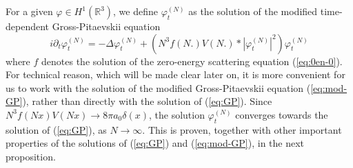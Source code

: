 \documentclass[11pt,a4paper,DIV11]{scrartcl}	%
\newcommand{\bR}{{\mathbb R}}
\begin{document}
For a given $\varphi \in H^1 (\bR^3)$, we define $\varphi^{(N)}_t$ as the solution of the modified time-dependent Gross-Pitaevskii equation
\begin{equation}\label{eq:mod-GP} i\partial_t \varphi_t^{(N)} = - \Delta \varphi_t^{(N)} + \left( N^3 f(N.) V(N.) * |\varphi^{(N)}_t|^2 \right) \varphi_t^{(N)} \end{equation}
where $f$ denotes the solution of the zero-energy scattering equation (\ref{eq:0en-0}). 
For technical reason, which will be made clear later on, it is more convenient for us to work with the solution of the modified Gross-Pitaevskii equation (\ref{eq:mod-GP}), rather than directly with the solution of (\ref{eq:GP}). Since $N^3 f(Nx) V(Nx) \to 8 \pi a_0 \delta (x)$, the solution $\varphi_t^{(N)}$ converges towards the solution of (\ref{eq:GP}), as $N \to \infty$. This is proven, together with other important properties of the solutions of (\ref{eq:GP}) and (\ref{eq:mod-GP}), in the next proposition. 
\end{document}
